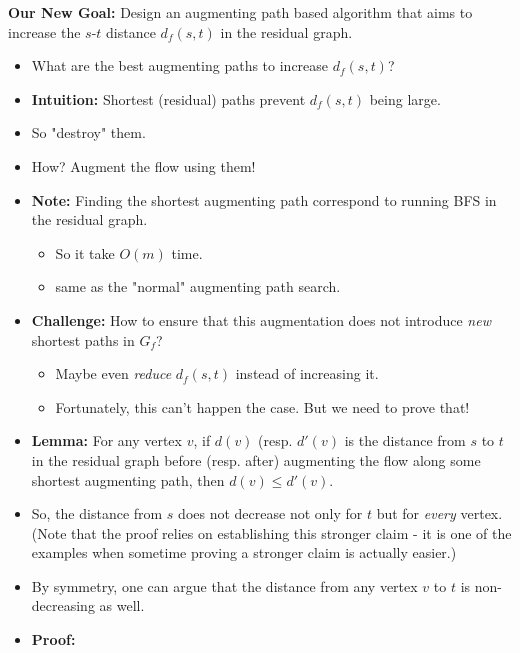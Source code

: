 \documentclass{article}
\begin{document}
\textbf{Our New Goal:} Design an augmenting path based algorithm that aims to increase the $s$-$t$ distance $d_f(s,t)$ in the residual graph.
\begin{itemize}
\item What are the best augmenting paths to increase $d_f(s,t)$?
\item \textbf{Intuition:} Shortest (residual) paths prevent $d_f(s,t)$ being large.
  \item So "destroy" them. 
  \item How? Augment the flow using them!
  \item \textbf{Note:} Finding the shortest augmenting path correspond to running BFS in the residual graph.
    \begin{itemize}
    \item So it take $O(m)$ time.
    \item same as the "normal" augmenting path search.
    \end{itemize}

  \item \textbf{Challenge:} How to ensure that this augmentation does not introduce {\em new} shortest paths in $G_f$?
    \begin{itemize}
    \item Maybe even {\em reduce} $d_f(s,t)$ instead of increasing it.
    \item Fortunately, this can't happen the case. But we need to prove that!
    \end{itemize}

  \item \textbf{Lemma:} For any vertex $v$, if $d(v)$ (resp. $d'(v)$ is the distance from $s$ to $t$ in the residual graph before (resp. after) augmenting the flow along some shortest augmenting path, then $d(v)\leq d'(v)$. 

\item So, the distance from $s$ does not decrease not only for $t$ but for {\em every} vertex. (Note that the proof relies on establishing this stronger claim - it is one of the examples when sometime proving a stronger claim is actually easier.) 

\item By symmetry, one can argue that the distance from any vertex $v$ to $t$ is non-decreasing as well. 

\item \textbf{Proof:}


\end{itemize}
\end{document}
